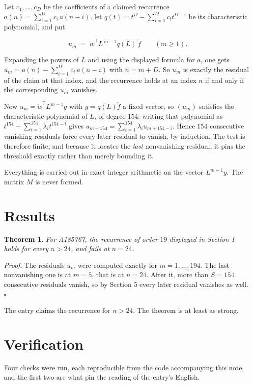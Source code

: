\documentclass[11pt]{article}
\newtheorem{theorem}{Theorem}
\theoremstyle{definition}
\begin{document}
Let $c_1,\dots,c_D$ be the coefficients of a claimed recurrence $a(n) = \sum_{i=1}^{D} c_i\,a(n-i)$, let $q(t) = t^{D} - \sum_{i=1}^{D} c_i t^{D-i}$ be its characteristic polynomial, and put

\[u_m \;=\; \tilde w^{\mathsf T} L^{\,m-1} q(L)\,\tilde f \qquad (m \ge 1).\]

Expanding the powers of $L$ and using the displayed formula for $a$, one gets $u_m = a(n) - \sum_{i=1}^{D} c_i\,a(n-i)$ with $n = m + D$. So $u_m$ is exactly the residual of the claim at that index, and the recurrence holds at an index $n$ if and only if the corresponding $u_m$ vanishes.

Now $u_m = \tilde w^{\mathsf T} L^{m-1} y$ with $y = q(L)\tilde f$ a fixed vector, so $(u_m)$ satisfies the characteristic polynomial of $L$, of degree $154$: writing that polynomial as $t^{154} - \sum_{i=1}^{154} \lambda_i t^{154-i}$ gives $u_{m+154} = \sum_{i=1}^{154} \lambda_i u_{m+154-i}$. Hence $154$ consecutive vanishing residuals force every later residual to vanish, by induction. The test is therefore finite; and because it locates the {\itshape last} nonvanishing residual, it pins the threshold exactly rather than merely bounding it.

Everything is carried out in exact integer arithmetic on the vector $L^{m-1}y$. The matrix $M$ is never formed.

\section{Results}

\begin{theorem} For A185767, the recurrence of order $19$ displayed in Section 1 holds for every $n > 24$, and fails at $n = 24$.\end{theorem}

{\itshape Proof.} The residuals $u_m$ were computed exactly for $m = 1,\dots,194$. The last nonvanishing one is at $m = 5$, that is at $n = 24$. After it, more than $S = 154$ consecutive residuals vanish, so by Section 5 every later residual vanishes as well. $\square$

The entry claims the recurrence for $n > 24$. The theorem is at least as strong.

\section{Verification}

Four checks were run, each reproducible from the code accompanying this note, and the first two are what pin the reading of the entry's English.
\end{document}
